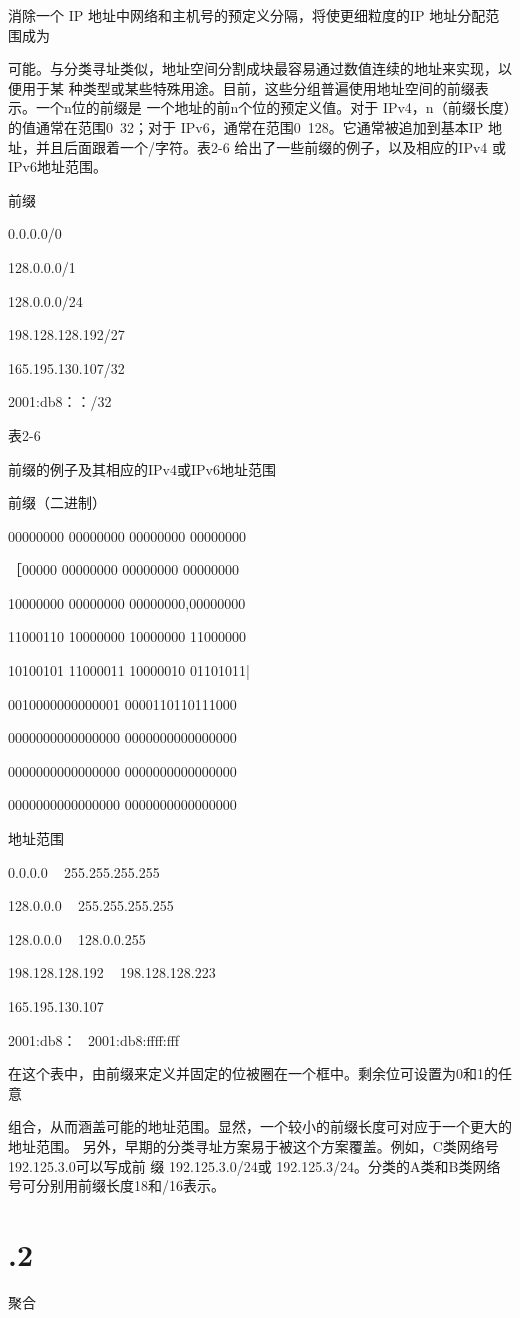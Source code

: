 消除一个 IP 地址中网络和主机号的预定义分隔，将使更细粒度的IP 地址分配范围成为

可能。与分类寻址类似，地址空间分割成块最容易通过数值连续的地址来实现，以便用于某
种类型或某些特殊用途。目前，这些分组普遍使用地址空间的前缀表示。一个n位的前缀是
一个地址的前n个位的预定义值。对于 IPv4，n（前缀长度）的值通常在范围0~32；对于
IPv6，通常在范围0~128。它通常被追加到基本IP 地址，并且后面跟着一个/字符。表2-6
给出了一些前缀的例子，以及相应的IPv4 或IPv6地址范围。

前缀

0.0.0.0/0

128.0.0.0/1

128.0.0.0/24

198.128.128.192/27

165.195.130.107/32

2001:db8：：/32

表2-6

前缀的例子及其相应的IPv4或IPv6地址范围

前缀（二进制）

00000000 00000000 00000000 00000000

［00000 00000000 00000000 00000000

10000000 00000000 00000000,00000000

11000110 10000000 10000000 11000000

10100101 11000011 10000010 01101011|

0010000000000001 0000110110111000

0000000000000000 0000000000000000

0000000000000000 0000000000000000

0000000000000000 0000000000000000

地址范围

0.0.0.0 ~ 255.255.255.255

128.0.0.0 ~ 255.255.255.255

128.0.0.0 ~ 128.0.0.255

198.128.128.192 ~ 198.128.128.223

165.195.130.107

2001:db8：~ 2001:db8:ffff:fff

在这个表中，由前缀来定义并固定的位被圈在一个框中。剩余位可设置为0和1的任意

组合，从而涵盖可能的地址范围。显然，一个较小的前缀长度可对应于一个更大的地址范围。
另外，早期的分类寻址方案易于被这个方案覆盖。例如，C类网络号192.125.3.0可以写成前
缀 192.125.3.0/24或 192.125.3/24。分类的A类和B类网络号可分别用前缀长度18和/16表示。
\section{.2}
聚合

